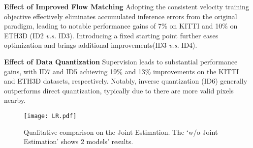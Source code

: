 \documentclass{article} %
\begin{document}
\textbf{Effect of Improved Flow Matching}
Adopting the consistent velocity training objective effectively eliminates accumulated inference errors from the original paradigm, leading to notable performance gains of 7\% on KITTI and 10\% on ETH3D (ID2 \textit{v.s.} ID3). Introducing a fixed starting point further eases optimization and brings additional improvements(ID3 \textit{v.s.} ID4).

\textbf{Effect of Data Quantization}
Supervision leads to substantial performance gains, with ID7 and ID5 achieving 19\% and 13\% improvements on the KITTI and ETH3D datasets, respectively. Notably, inverse quantization (ID6) generally outperforms direct quantization, typically due to there are more valid pixels nearby.

\begin{wrapfigure}{r}{0.6\textwidth}
  \centering
  \vspace{-1.5em}
  \texttt{[image: LR.pdf]}
  \vspace{-1em}
  \caption{Qualitative comparison on the Joint Estimation. The `w/o Joint Estimation' shows 2 models' results.}
  \label{fig:joint}
  \vspace{-1em}
\end{wrapfigure}
\end{document}
